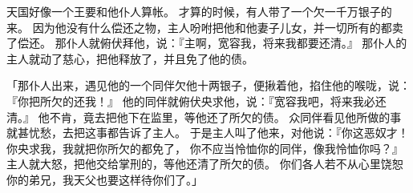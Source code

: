 {天国好像一个王要和他仆人算帐。
才算的时候，有人带了一个欠一千万银子的来。
因为他没有什么偿还之物，主人吩咐把他和他妻子儿女，并一切所有的都卖了偿还。
那仆人就俯伏拜他，说：『主啊，宽容我，将来我都要还清。』
那仆人的主人就动了慈心，把他释放了，并且免了他的债。
\par }{\PP {}「那仆人出来，遇见他的一个同伴欠他十两银子，便揪着他，掐住他的喉咙，说：『你把所欠的还我！』
他的同伴就俯伏央求他，说：『宽容我吧，将来我必还清。』
他不肯，竟去把他下在监里，等他还了所欠的债。
众同伴看见他所做的事就甚忧愁，去把这事都告诉了主人。
于是主人叫了他来，对他说：『你这恶奴才！你央求我，我就把你所欠的都免了，
你不应当怜恤你的同伴，像我怜恤你吗？』
主人就大怒，把他交给掌刑的，等他还清了所欠的债。
你们各人若不从心里饶恕你的弟兄，我天父也要这样待你们了。」

}
